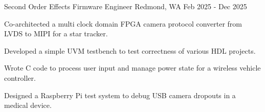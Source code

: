   \begin{cventry}
    {Second Order Effects} %
    {Firmware Engineer} %
    {Redmond, WA} %
    {Feb 2025 - Dec 2025} %
    {
    \begin{cvitems}
      \item{
      Co-architected a multi clock domain FPGA camera protocol converter from LVDS to MIPI for a star tracker.
      }
      \item{
      Developed a simple UVM testbench to test correctness of various HDL projects.
      }
      \item{
      Wrote C code to process user input and manage power state for a wireless vehicle controller.
      }
      \item{
      Designed a Raspberry Pi test system to debug USB camera dropouts in a medical device.
      }
    \end{cvitems}
    }
  \end{cventry}
